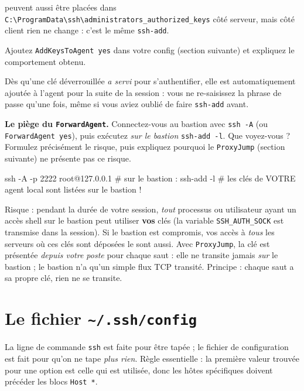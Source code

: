 \documentclass[a4paper,10pt]{exam}
\begin{document}
\begin{questions}
\begin{solution}
peuvent aussi être placées dans
\texttt{C:\textbackslash ProgramData\textbackslash ssh\textbackslash administrators\_authorized\_keys}
côté serveur, mais côté client rien ne change : c'est le même \texttt{ssh-add}.
\end{solution}
\question Ajoutez \texttt{AddKeysToAgent yes} dans votre config (section suivante) et expliquez
le comportement obtenu.
\begin{solution}
Dès qu'une clé déverrouillée \emph{a servi} pour s'authentifier, elle est automatiquement
ajoutée à l'agent pour la suite de la session : vous ne re-saisissez la phrase de passe
qu'une fois, même si vous aviez oublié de faire \texttt{ssh-add} avant.
\end{solution}
\question \textbf{Le piège du \texttt{ForwardAgent}.} Connectez-vous au bastion avec
\texttt{ssh -A} (ou \texttt{ForwardAgent yes}), puis exécutez \emph{sur le bastion}
\texttt{ssh-add -l}. Que voyez-vous ? Formulez précisément le risque, puis expliquez
pourquoi le \texttt{ProxyJump} (section suivante) ne présente pas ce risque.
\begin{solution}
\begin{bashcode}
ssh -A -p 2222 root@127.0.0.1
# sur le bastion :
ssh-add -l
# les clés de VOTRE agent local sont listées sur le bastion !
\end{bashcode}
Risque : pendant la durée de votre session, \emph{tout} processus ou utilisateur ayant un
accès shell sur le bastion peut utiliser \textbf{vos} clés (la variable \texttt{SSH\_AUTH\_SOCK}
est transmise dans la session). Si le bastion est compromis, vos accès à \emph{tous} les
serveurs où ces clés sont déposées le sont aussi.
Avec \texttt{ProxyJump}, la clé est présentée \emph{depuis votre poste} pour chaque saut :
elle ne transite jamais \emph{sur} le bastion ; le bastion n'a qu'un simple flux TCP
transité. Principe : chaque saut a sa propre clé, rien ne se transite.
\end{solution}
\end{questions}

\section{Le fichier \texttt{\textasciitilde/.ssh/config}}

La ligne de commande \texttt{ssh} est faite pour être tapée ; le fichier de configuration est
fait pour qu'on ne tape \emph{plus rien}. Règle essentielle : la première valeur trouvée
pour une option est celle qui est utilisée, donc les hôtes spécifiques doivent précéder les
blocs \texttt{Host *}.
\end{document}
